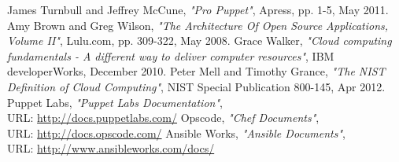 \begin{thebibliography}{9}
\bibitem{} James Turnbull and Jeffrey McCune, \emph{"Pro Puppet"}, Apress, pp. 1-5, May 2011.
\bibitem{} Amy Brown and Greg Wilson, \emph{"The Architecture Of Open Source Applications, Volume II"}, Lulu.com, pp. 309-322, May 2008.
\bibitem{} Grace Walker, \emph{"Cloud computing fundamentals - A different way to deliver computer resources"}, IBM developerWorks, December 2010.
\bibitem{} Peter Mell and Timothy Grance, \emph{"The NIST Definition of Cloud Computing"}, NIST Special Publication 800-145, Apr 2012.
\bibitem{} Puppet Labs, \emph{"Puppet Labs Documentation"}, \\URL: \url{http://docs.puppetlabs.com/}
\bibitem{} Opscode, \emph{"Chef Documents"}, \\URL: \url{http://docs.opscode.com/}
\bibitem{} Ansible Works, \emph{"Ansible Documents"}, \\URL: \url{http://www.ansibleworks.com/docs/}
\end{thebibliography}
